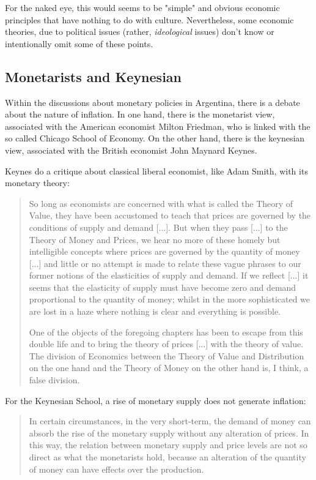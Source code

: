 \documentclass[12pt,a4paper,twoside]{book}
\begin{document}
\begin{itemize}

For the naked eye, this would seems to be "simple" and obvious economic principles that have nothing to do with culture. Nevertheless, some economic theories, due to political issues (rather, \textit{ideological} issues) don't know or intentionally omit some of these points.

\subsection{Monetarists and Keynesian}
Within the discussions about monetary policies in Argentina, there is a debate about the nature of inflation. In one hand, there is the monetarist view, associated with the American economist Milton Friedman, who is linked with the so called Chicago School of Economy. On the other hand, there is the keynesian view, associated with the British economist John Maynard Keynes.

Keynes do a critique about classical liberal economist, like Adam Smith, with its monetary theory:

\begin{quotation}
So long as economists are concerned with what is called the Theory of Value, they have been accustomed to teach that prices are governed by the conditions of supply and demand [...]. But when they pass [...] to the Theory of Money and Prices, we hear no more of these homely but intelligible concepts where prices are governed by the quantity of money [...] and little or no attempt is made to relate these vague phrases to our former notions of the elasticities of supply and demand. If we reflect [...] it seems that the elasticity of supply must have become zero and demand proportional to the quantity of money; whilst in the more sophisticated we are lost in a haze where nothing is clear and everything is possible.

One of the objects of the foregoing chapters has been to escape from this double life and to bring the theory of prices [...] with the theory of value. The division of Economics between the Theory of Value and Distribution on the one hand and the Theory of Money on the other hand is, I think, a false division. \cite[pp. 292-293]{keynes}
\end{quotation}

For the Keynesian School, a rise of monetary supply does not generate inflation:

\begin{quotation}
In certain circumstances, in the very short-term, the demand of money can absorb the rise of the monetary supply without any alteration of prices. In this way, the relation between monetary supply and price levels are not so direct as what the monetarists hold, because an alteration of the quantity of money can have effects over the production. \cite[pág. 300]{mochobeker}
\end{quotation}


\end{itemize}
\end{document}
